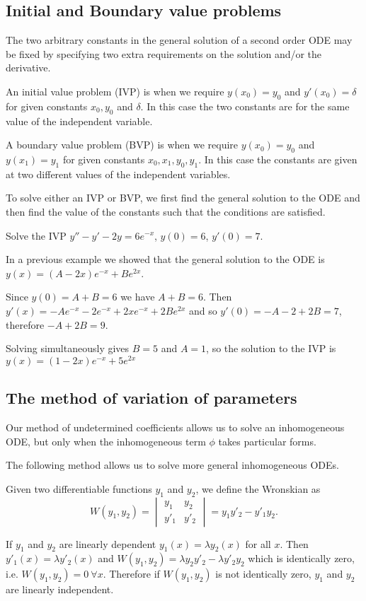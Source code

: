 \documentclass[10pt, a4paper]{article}
\begin{document}
\subsection{Initial and Boundary value problems}
The two arbitrary constants in the general solution of a second order ODE may be fixed by specifying two extra requirements on the solution and/or the derivative.

An initial value problem (IVP) is when we require $y(x_0) = y_0$ and $y'(x_0) = \delta$ for given constants $x_0, y_0$ and $\delta$.
In this case the two constants are for the same value of the independent variable.

A boundary value problem (BVP) is when we require $y(x_0) = y_0$ and $y(x_1) = y_1$ for given constants $x_0, x_1, y_0, y_1$.
In this case the constants are given at two different values of the independent variables.

To solve either an IVP or BVP,
we first find the general solution to the ODE and then find the value of the constants such that the conditions are satisfied.

\begin{example}
    Solve the IVP $y'' -y' - 2y = 6e ^ {-x}$,
    $y(0) = 6$,
    $y'(0) = 7$.

    In a previous example we showed that the general solution to the ODE is $y(x) = (A - 2x)e ^ {-x} + Be ^ {2x}$.

    Since $y(0) = A + B = 6$ we have $A + B = 6$.
    Then $y'(x) = -Ae ^ {-x} - 2e ^ {-x} + 2xe ^ {-x} + 2Be ^ {2x}$ and so $y'(0) = -A - 2 + 2B = 7$,
    therefore $-A + 2B = 9$.
    
    Solving simultaneously gives $B = 5$ and $A = 1$,
    so the solution to the IVP is $y(x) = (1 - 2x)e ^ {-x} + 5e ^ {2x}$
\end{example}

\subsection{The method of variation of parameters}
Our method of undetermined coefficients allows us to solve an inhomogeneous ODE,
but only when the inhomogeneous term $\phi$ takes particular forms.

The following method allows us to solve more general inhomogeneous ODEs.
\begin{definition}
    Given two differentiable functions $y_1$ and $y_2$,
    we define the Wronskian as
    \[
    W(y_1, y_2) = \begin{vmatrix}
        y_1 & y_2 \\ y'_1 & y'_2
    \end{vmatrix} = y_1y'_2 - y'_1y_2.
    \]
\end{definition}
If $y_1$ and $y_2$ are linearly dependent $y_1(x) = \lambda y_2(x)$ for all $x$.
Then $y'_1(x) = \lambda y'_2(x)$ and $W(y_1, y_2) = \lambda y_2y'_2 - \lambda y'_2y_2$ which is identically zero,
i.e. $W(y_1, y_2) = 0\  \forall x$.
Therefore if $W(y_1, y_2)$ is not identically zero,
$y_1$ and $y_2$ are linearly independent.
\end{document}
